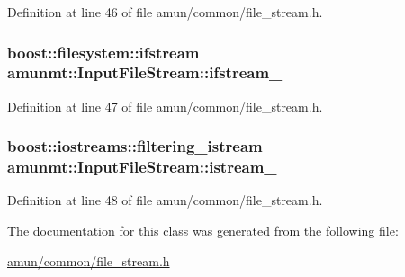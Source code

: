 Definition at line 46 of file amun/common/file\+\_\+stream.\+h.

\subsubsection[{\texorpdfstring{ifstream\+\_\+}{ifstream_}}]{\setlength{\rightskip}{0pt plus 5cm}boost\+::filesystem\+::ifstream amunmt\+::\+Input\+File\+Stream\+::ifstream\+\_\+\hspace{0.3cm}{\ttfamily [private]}}\hypertarget{classamunmt_1_1InputFileStream_a1ed4c98694688ee5e7ba39c7005ed56a}{}\label{classamunmt_1_1InputFileStream_a1ed4c98694688ee5e7ba39c7005ed56a}


Definition at line 47 of file amun/common/file\+\_\+stream.\+h.

\subsubsection[{\texorpdfstring{istream\+\_\+}{istream_}}]{\setlength{\rightskip}{0pt plus 5cm}boost\+::iostreams\+::filtering\+\_\+istream amunmt\+::\+Input\+File\+Stream\+::istream\+\_\+\hspace{0.3cm}{\ttfamily [private]}}\hypertarget{classamunmt_1_1InputFileStream_a8701f7b64ec9d6f818cbf6db77645f18}{}\label{classamunmt_1_1InputFileStream_a8701f7b64ec9d6f818cbf6db77645f18}


Definition at line 48 of file amun/common/file\+\_\+stream.\+h.



The documentation for this class was generated from the following file\+:\begin{DoxyCompactItemize}
\item 
\hyperlink{amun_2common_2file__stream_8h}{amun/common/file\+\_\+stream.\+h}\end{DoxyCompactItemize}
